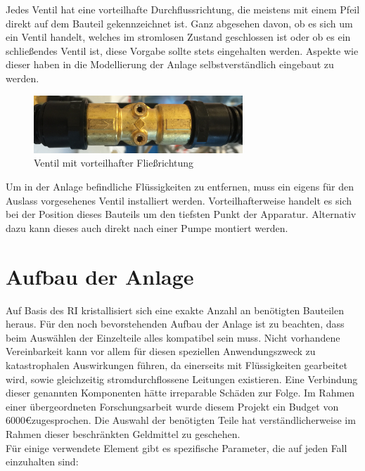 Jedes Ventil hat eine vorteilhafte Durchflussrichtung, die meistens mit einem Pfeil direkt auf dem Bauteil gekennzeichnet ist. Ganz abgesehen davon, ob es sich um ein Ventil handelt, welches im stromlosen Zustand geschlossen ist oder ob es ein schließendes Ventil ist, diese Vorgabe sollte stets eingehalten werden. Aspekte wie dieser haben in die Modellierung der Anlage selbstverständlich eingebaut zu werden.\\

\begin{figure}[h!]
  \centering
  \includegraphics[width=0.7\textwidth]{graphics/implementation/Fliessrichtung.jpg}
  \caption{Ventil mit vorteilhafter Fließrichtung}
\end{figure}

Um in der Anlage befindliche Flüssigkeiten zu entfernen, muss ein eigens für den Auslass vorgesehenes Ventil installiert werden. Vorteilhafterweise handelt es sich bei der Position dieses Bauteils um den tiefsten Punkt der Apparatur. Alternativ dazu kann dieses auch direkt nach einer Pumpe montiert werden.

\section{Aufbau der Anlage}
Auf Basis des \ac{RI} kristallisiert sich eine exakte Anzahl an benötigten Bauteilen heraus. Für den noch bevorstehenden Aufbau der Anlage ist zu beachten, dass beim Auswählen der Einzelteile alles kompatibel sein muss. Nicht vorhandene Vereinbarkeit kann vor allem für diesen speziellen Anwendungszweck zu katastrophalen Auswirkungen führen, da einerseits mit Flüssigkeiten gearbeitet wird, sowie gleichzeitig stromdurchflossene Leitungen existieren. Eine Verbindung dieser genannten Komponenten hätte irreparable Schäden zur Folge. Im Rahmen einer übergeordneten Forschungsarbeit wurde diesem Projekt ein Budget von 6000\euro \space zugesprochen. Die Auswahl der benötigten Teile hat verständlicherweise im Rahmen dieser beschränkten Geldmittel zu geschehen.\\
	
	Für einige verwendete Element gibt es spezifische Parameter, die auf jeden Fall einzuhalten sind:\\
	

